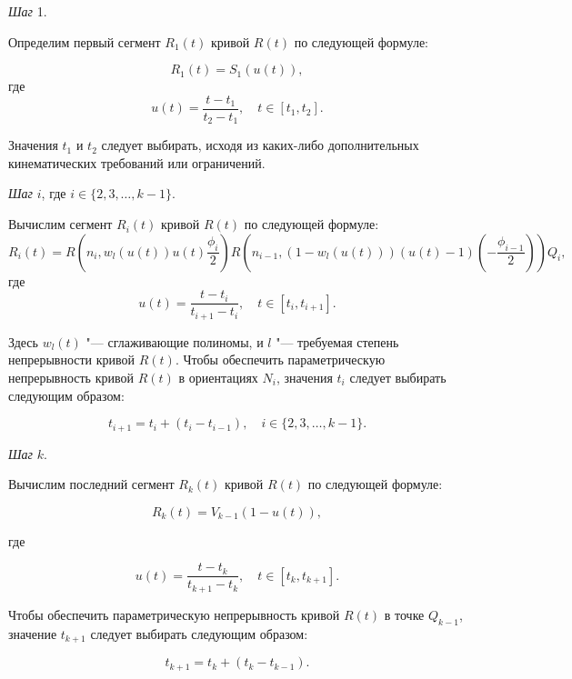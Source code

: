 \bigskip
\textit{Шаг} 1.

Определим первый сегмент $R_1(t)$ кривой $R(t)$ по следующей формуле:

$$
R_1(t)=S_1(u(t)),
$$
\noindent где
$$
u(t)=\frac{t-t_1}{t_2-t_1}, \quad t \in [t_1,t_2].
$$

Значения $t_1$ и $t_2$ следует выбирать, исходя из каких-либо дополнительных кинематических требований или ограничений.

\bigskip
\textit{Шаг} $i$, где $i \in \{2,3,\dots,k-1\}$.

Вычислим сегмент $R_i(t)$ кривой $R(t)$ по следующей формуле:
$$
R_i(t)=R(n_i,w_l(u(t))u(t)\frac{\phi_i}{2})R(n_{i-1},(1-w_l(u(t)))(u(t)-1)(-\frac{\phi_{i-1}}{2}))Q_i,
$$
\noindent где
$$
u(t)=\frac{t-t_i}{t_{i+1}-t_i}, \quad t \in [t_i,t_{i+1}].
$$

Здесь $w_l(t)$ "--- сглаживающие полиномы, и $l$ "--- требуемая степень непрерывности кривой $R(t)$. Чтобы обеспечить
параметрическую непрерывность кривой $R(t)$ в ориентациях $N_i$, значения $t_i$ следует выбирать следующим образом:

$$
t_{i+1}=t_i+(t_i-t_{i-1}), \quad i \in \{2,3,\dots,k-1\}.
$$

\bigskip
\textit{Шаг} $k$.

Вычислим последний сегмент $R_k(t)$ кривой $R(t)$ по следующей формуле:

$$
R_k(t)=V_{k-1}(1-u(t)),
$$

\noindent где

$$
u(t)=\frac{t-t_k}{t_{k+1}-t_k}, \quad t \in [t_k,t_{k+1}].
$$

Чтобы обеспечить параметрическую непрерывность кривой $R(t)$ в точке $Q_{k-1}$, значение $t_{k+1}$ следует выбирать
следующим образом:

$$
t_{k+1}=t_k+(t_k-t_{k-1}).
$$
